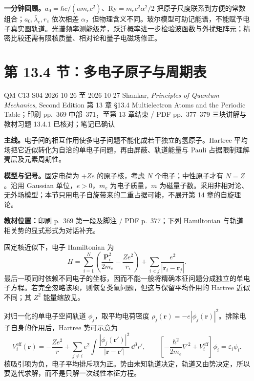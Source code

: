 
\textbf{一分钟回顾。}$a_0=\hbar c/(\alpha m_ec^2)$、$\mathrm{Ry}=m_ec^2\alpha^2/2$ 把原子尺度联系到方便的常数组合；$a_0,\bar\lambda_e,r_e$ 依次相差 $\alpha$，但物理含义不同。玻尔模型可助记能谱，不能赋予电子真实圆轨道。光谱频率测能级差，跃迁概率进一步检验波函数与外扰矩阵元；精密比较还需有限核质量、相对论和量子电磁场修正。

\section{第 13.4 节：多电子原子与周期表}
\label{section:QM-C13-S04}
\studymeta
  {QM-C13-S04}
  {2026-10-26 至 2026-10-27}
  {Shankar, \textit{Principles of Quantum Mechanics}, Second Edition}
  {第 13 章 \S 13.4 Multielectron Atoms and the Periodic Table；印刷 pp.~369 中部--371，至第 13 章结束 / PDF pp.~377--379}
  {三块讲解与教材习题 13.4.1 已核对；笔记已确认}

\textbf{主线。}电子间的相互作用使多电子问题不能化成若干独立的氢原子。Hartree 平均场把它近似转化为自洽的单电子问题，再由屏蔽、轨道能量与 Pauli 占据限制理解壳层及元素周期性。

\textbf{模型与记号。}固定电荷为 $+Ze$ 的原子核，考虑 $N$ 个电子；中性原子才有 $N=Z$。沿用 Gaussian 单位，$e>0$，$m_e$ 为电子质量，$m$ 为磁量子数。采用非相对论、无外场模型；本节只用电子自旋带来的二重占据可能，不展开第 14 章的自旋理论。

\textbf{教材位置：}印刷 p.~369 第一段及脚注 / PDF p.~377；下列 Hamiltonian 与轨道相关势的显式形式为对话补充。

固定核近似下，电子 Hamiltonian 为
\begin{equation}
  \boxed{H=\sum_{i=1}^{N}\left(\frac{\mathbf P_i^2}{2m_e}
    -\frac{Ze^2}{r_i}\right)
    +\sum_{i<j}\frac{e^2}{|\mathbf r_i-\mathbf r_j|}.}
\end{equation}
最后一项同时依赖不同电子的坐标，因而不能一般将精确本征问题分成独立的单电子方程。若完全忽略该项，则恢复类氢问题，但这与保留平均作用的 Hartree 近似不同；其 $Z^2$ 能量缩放见。

对归一化的单电子空间轨道 $\phi_j$，取平均电荷密度
$\rho_j(\mathbf r)=-e|\phi_j(\mathbf r)|^2$。排除电子自身的作用后，Hartree 势可示意为
\begin{equation}
  V_i^{\mathrm{eff}}(\mathbf r)=-\frac{Ze^2}{r}
   +\sum_{j\ne i}e^2\int
       \frac{|\phi_j(\mathbf r')|^2}{|\mathbf r-\mathbf r'|}\,\dd^3r',
  \qquad
  \left[-\frac{\hbar^2}{2m_e}\nabla^2+V_i^{\mathrm{eff}}\right]\phi_i
       =\varepsilon_i\phi_i.
\end{equation}
核吸引项为负，电子平均排斥项为正。势由未知轨道决定，轨道又由势决定，所以要迭代求解，而不是只解一次线性本征方程。

